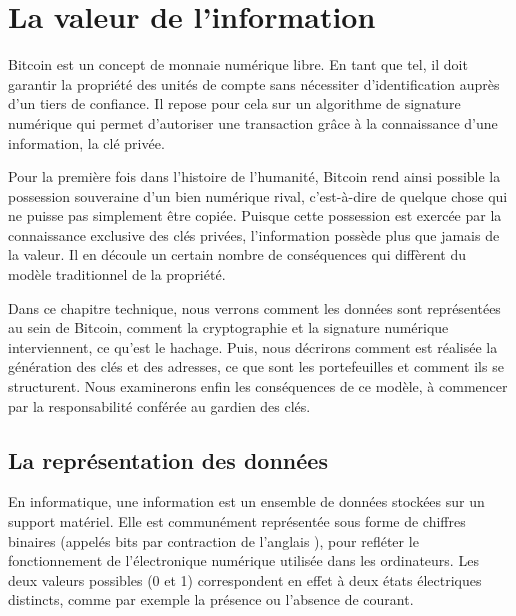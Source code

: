
\chapter{La valeur de l'information}
\label{ch:7}

Bitcoin est un concept de monnaie numérique libre. En tant que tel, il doit garantir la propriété des unités de compte sans nécessiter d'identification auprès d'un tiers de confiance. Il repose pour cela sur un algorithme de signature numérique qui permet d'autoriser une transaction grâce à la connaissance d'une information, la clé privée.

Pour la première fois dans l'histoire de l'humanité, Bitcoin rend ainsi possible la possession souveraine d'un bien numérique rival, c'est-à-dire de quelque chose qui ne puisse pas simplement être copiée. Puisque cette possession est exercée par la connaissance exclusive des clés privées, l'information possède plus que jamais de la valeur. Il en découle un certain nombre de conséquences qui diffèrent du modèle traditionnel de la propriété.


Dans ce chapitre technique, nous verrons comment les données sont représentées au sein de Bitcoin, comment la cryptographie et la signature numérique interviennent, ce qu'est le hachage. Puis, nous décrirons comment est réalisée la génération des clés et des adresses, ce que sont les portefeuilles et comment ils se structurent. Nous examinerons enfin les conséquences de ce modèle, à commencer par la responsabilité conférée au gardien des clés.

\section*{La représentation des données}


En informatique, une information est un ensemble de données stockées sur un support matériel. Elle est communément représentée sous forme de chiffres binaires (appelés bits par contraction de l'anglais ), pour refléter le fonctionnement de l'électronique numérique utilisée dans les ordinateurs. Les deux valeurs possibles (0 et 1) correspondent en effet à deux états électriques distincts, comme par exemple la présence ou l'absence de courant. %

